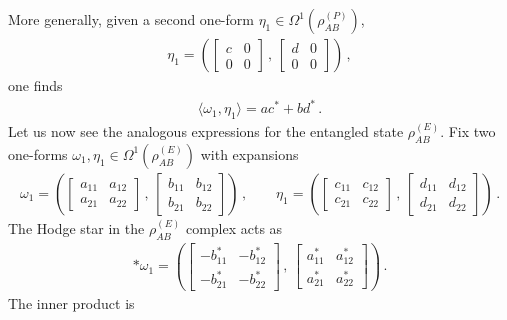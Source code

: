 \documentclass[12pt]{article}
\numberwithin{equation}{section}
\begin{document}
More generally, given a second one-form $\eta_1 \in \Omega^1 ( \rho_{AB}^{(P)} )$,
%
\begin{align}
    \eta_1 = \left( \begin{bmatrix} c & 0 \\ 0 & 0 \end{bmatrix} \, , \, \begin{bmatrix} d & 0 \\ 0 & 0 \end{bmatrix} \right) \, , 
\end{align}
%
one finds
%
\begin{align}
    \langle \omega_1, \eta_1 \rangle = a c^\ast + b d^\ast \, .
\end{align}
%
Let us now see the analogous expressions for the entangled state $\rho_{AB}^{(E)}$. Fix two one-forms $\omega_1, \eta_1 \in \Omega^1 ( \rho_{AB}^{(E)} )$ with expansions
%
\begin{align}
    \omega_1 = \left( \begin{bmatrix} a_{11} & a_{12} \\ a_{21} & a_{22} \end{bmatrix} \, , \, \begin{bmatrix} b_{11} & b_{12} \\ b_{21} & b_{22} \end{bmatrix} \right) \, , \qquad \eta_1 = \left( \begin{bmatrix} c_{11} & c_{12} \\ c_{21} & c_{22} \end{bmatrix} \, , \, \begin{bmatrix} d_{11} & d_{12} \\ d_{21} & d_{22} \end{bmatrix} \right) \, .
\end{align}
%
The Hodge star in the $\rho_{AB}^{(E)}$ complex acts as
%
\begin{align}
    \ast \omega_1 = \left( \begin{bmatrix} - b_{11}^\ast & - b_{12}^\ast \\ - b_{21}^\ast & -b_{22}^\ast \end{bmatrix} \, , \, \begin{bmatrix} a_{11}^\ast & a_{12}^\ast \\ a_{21}^\ast & a_{22}^\ast \end{bmatrix} \right) \, .
\end{align}
%
The inner product is
%
\end{document}
